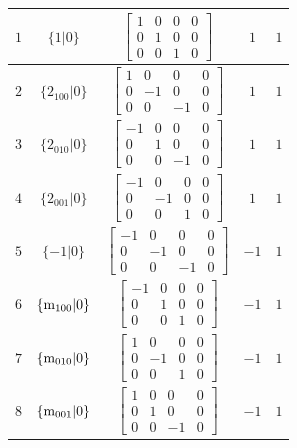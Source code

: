 \documentclass[fleqn,8pt]{jsarticle}
\begin{document}
\begin{longtable}{ccccc}
$ 1 $ & $ \{1|0\} $ & $ \begin{bmatrix} 1 & 0 & 0 & 0 \\ 0 & 1 & 0 & 0 \\ 0 & 0 & 1 & 0 \end{bmatrix} $ & $ 1 $ & $ 1 $ \\ \hline
$ 2 $ & $ \{2{}_{100}|0\} $ & $ \begin{bmatrix} 1 & 0 & 0 & 0 \\ 0 & -1 & 0 & 0 \\ 0 & 0 & -1 & 0 \end{bmatrix} $ & $ 1 $ & $ 1 $ \\ \hline
$ 3 $ & $ \{2{}_{010}|0\} $ & $ \begin{bmatrix} -1 & 0 & 0 & 0 \\ 0 & 1 & 0 & 0 \\ 0 & 0 & -1 & 0 \end{bmatrix} $ & $ 1 $ & $ 1 $ \\ \hline
$ 4 $ & $ \{2{}_{001}|0\} $ & $ \begin{bmatrix} -1 & 0 & 0 & 0 \\ 0 & -1 & 0 & 0 \\ 0 & 0 & 1 & 0 \end{bmatrix} $ & $ 1 $ & $ 1 $ \\ \hline
$ 5 $ & $ \{-1|0\} $ & $ \begin{bmatrix} -1 & 0 & 0 & 0 \\ 0 & -1 & 0 & 0 \\ 0 & 0 & -1 & 0 \end{bmatrix} $ & $ -1 $ & $ 1 $ \\ \hline
$ 6 $ & $ \{{\rm m}_{100}|0\} $ & $ \begin{bmatrix} -1 & 0 & 0 & 0 \\ 0 & 1 & 0 & 0 \\ 0 & 0 & 1 & 0 \end{bmatrix} $ & $ -1 $ & $ 1 $ \\ \hline
$ 7 $ & $ \{{\rm m}_{010}|0\} $ & $ \begin{bmatrix} 1 & 0 & 0 & 0 \\ 0 & -1 & 0 & 0 \\ 0 & 0 & 1 & 0 \end{bmatrix} $ & $ -1 $ & $ 1 $ \\ \hline
$ 8 $ & $ \{{\rm m}_{001}|0\} $ & $ \begin{bmatrix} 1 & 0 & 0 & 0 \\ 0 & 1 & 0 & 0 \\ 0 & 0 & -1 & 0 \end{bmatrix} $ & $ -1 $ & $ 1 $ \\ \hline

\end{longtable}
\end{document}
